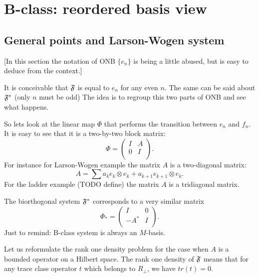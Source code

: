 \documentclass[12pt]{amsart}
\theoremstyle{case}
\begin{document}
\section{B-class: reordered basis view}
  \subsection{General points and Larson-Wogen system}
    [In this section the notation of ONB $\{e_n\}$ is being a little abused, but is easy to deduce from the context.]

    \medskip
    It is conceivable that $\mathfrak{F}$ is equal to $e_n$ for any even $n$.
    The same can be said about $\mathfrak{F^{*}}$ (only $n$ must be odd)
    The idea is to regroup this two parts of ONB and see what happens.

    So lets look at the linear map $\Phi$ that performs the transition between ${e_n}$ and ${f_n}$.
    It is easy to see that it is a two-by-two block matrix:
    \[
      \Phi= \left( {
        \begin{array}{cc}
          I & A\\
          0 & I\\
        \end{array}
      }
    \right).
    \]
    For instance for Larson-Wogen example the matrix $A$ is a two-diagonal matrix:
    \[
      A = \sum a_k e_k \otimes e_k + a_{k + 1} e_{k + 1} \otimes e_k.
    \]
    For the ladder example (TODO define) the matrix $A$ is a tridiagonal matrix.

    The biorthogonal system $\mathfrak{F^{*}}$ corresponds to a very similar matrix
    \[
      \Phi_* = \left( {
        \begin{array}{cc}
           I   & 0\\
          -A^* & I\\
        \end{array}
        }
      \right).
    \]
    Just to remind: B-class system is always an $M$-basis.

    Let us reformulate the rank one density problem for the case when $A$ is a bounded operator on a Hilbert space.
    The rank one density of $\mathfrak{F}$ means that for any trace class operator $t$ which belongs to $R_\perp$,
      we have $tr(t) = 0$.
\end{document}
